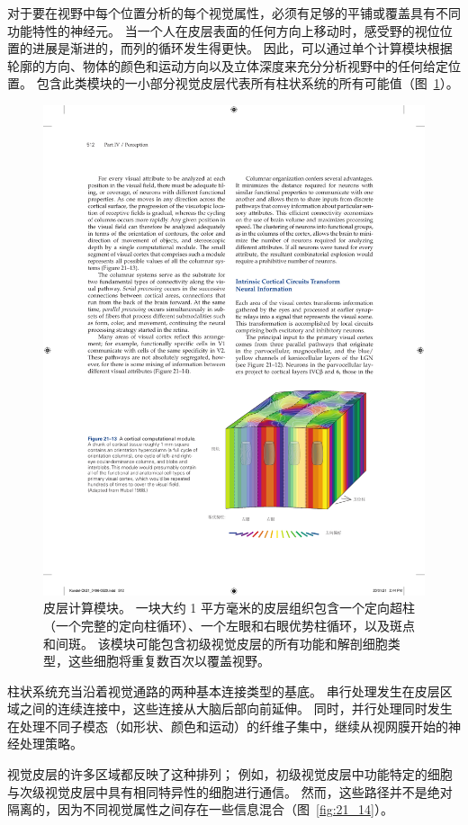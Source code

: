 对于要在视野中每个位置分析的每个视觉属性，必须有足够的平铺或覆盖具有不同功能特性的神经元。
当一个人在皮层表面的任何方向上移动时，感受野的视位位置的进展是渐进的，而列的循环发生得更快。
因此，可以通过单个计算模块根据轮廓的方向、物体的颜色和运动方向以及立体深度来充分分析视野中的任何给定位置。
包含此类模块的一小部分视觉皮层代表所有柱状系统的所有可能值（图~\ref{fig:21_13}）。


\begin{figure}[htbp]
	\centering
	\includegraphics[width=0.7\linewidth]{chap21/fig_21_13}
	\caption{皮层计算模块。 
		一块大约 1 平方毫米的皮层组织包含一个定向超柱（一个完整的定向柱循环）、一个左眼和右眼优势柱循环，以及斑点和间斑。
		该模块可能包含初级视觉皮层的所有功能和解剖细胞类型，这些细胞将重复数百次以覆盖视野\cite{hubel1995eye}。}
	\label{fig:21_13}
\end{figure}


柱状系统充当沿着视觉通路的两种基本连接类型的基底。
串行处理发生在皮层区域之间的连续连接中，这些连接从大脑后部向前延伸。
同时，并行处理同时发生在处理不同子模态（如形状、颜色和运动）的纤维子集中，继续从视网膜开始的神经处理策略。


视觉皮层的许多区域都反映了这种排列；
例如，初级视觉皮层中功能特定的细胞与次级视觉皮层中具有相同特异性的细胞进行通信。
然而，这些路径并不是绝对隔离的，因为不同视觉属性之间存在一些信息混合（图~\ref{fig:21_14}）。


